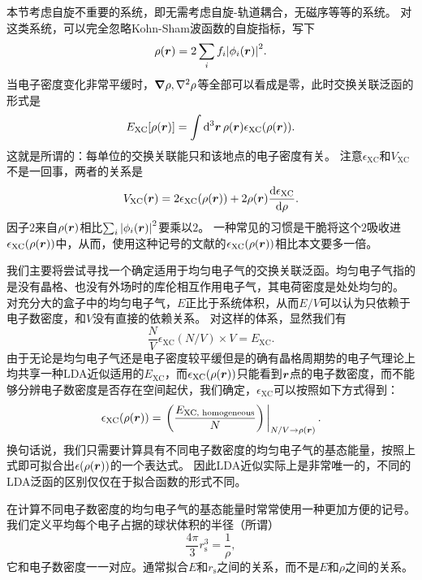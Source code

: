 本节考虑自旋不重要的系统，即无需考虑自旋-轨道耦合，无磁序等等的系统。
对这类系统，可以完全忽略Kohn-Sham波函数的自旋指标，写下
\begin{equation}
    \rho(\vb*{r}) = 2 \sum_{i} f_i \abs{\phi_i(\vb*{r})}^2.
\end{equation}
当电子密度变化非常平缓时，$\grad{\rho},\laplacian{\rho}$等全部可以看成是零，此时交换关联泛函的形式是
\begin{equation}
    E_\text{XC}[\rho(\vb*{r})] = \int \dd[3]{\vb*{r}} \rho(\vb*{r}) \epsilon_\text{XC}(\rho(\vb*{r})).
\end{equation}
这就是所谓的：每单位的交换关联能只和该地点的电子密度有关。
注意$\epsilon_\text{XC}$和$V_\text{XC}$不是一回事，两者的关系是
\begin{equation}
    V_\text{XC}(\vb*{r}) = 2 \epsilon_{\text{XC}}(\rho(\vb*{r})) + 2 \rho(\vb*{r}) \dv{\epsilon_\text{XC}}{\rho}.
    \label{eq:from-epsilon-xc-to-v-xc}
\end{equation}
因子$2$来自$\rho(\vb*{r})$相比$\sum_i \abs{\phi_i(\vb*{r})}^2$要乘以$2$。
一种常见的习惯是干脆将这个$2$吸收进$\epsilon_\text{XC}(\rho(\vb*{r}))$中，从而，使用这种记号的文献的$\epsilon_\text{XC}(\rho(\vb*{r}))$相比本文要多一倍。

我们主要将尝试寻找一个确定适用于均匀电子气的交换关联泛函。均匀电子气指的是没有晶格、也没有外场时的库伦相互作用电子气，其电荷密度是处处均匀的。
对充分大的盒子中的均匀电子气，$E$正比于系统体积，从而$E / V$可以认为只依赖于电子数密度，和$V$没有直接的依赖关系。
对这样的体系，显然我们有
\begin{equation}
    \frac{N}{V} \epsilon_\text{XC}(N / V) \times V = E_\text{XC}.
\end{equation}
由于无论是均匀电子气还是电子密度较平缓但是的确有晶格周期势的电子气理论上均共享一种LDA近似适用的$E_\text{XC}$，而$\epsilon_\text{XC}(\rho(\vb*{r}))$只能看到$\vb*{r}$点的电子数密度，而不能够分辨电子数密度是否存在空间起伏，我们确定，$\epsilon_\text{XC}$可以按照如下方式得到：
\begin{equation}
    \epsilon_\text{XC}(\rho(\vb*{r})) = \eval{\left( \frac{E_\text{XC, homogeneous}}{N} \right)}_{N / V \to \rho(\vb*{r})}.
    \label{eq:from-homogeneous-electron-gas}
\end{equation}
换句话说，我们只需要计算具有不同电子数密度的均匀电子气的基态能量，按照上式即可拟合出$\epsilon(\rho(\vb*{r}))$的一个表达式。
因此LDA近似实际上是非常唯一的，不同的LDA泛函的区别仅仅在于拟合函数的形式不同。

在计算不同电子数密度的均匀电子气的基态能量时常常使用一种更加方便的记号。我们定义平均每个电子占据的球状体积的半径（所谓）
\begin{equation}
    \frac{4\pi}{3} r_\text{s}^3 = \frac{1}{\rho},
\end{equation}
它和电子数密度一一对应。通常拟合$E$和$r_\text{s}$之间的关系，而不是$E$和$\rho$之间的关系。

